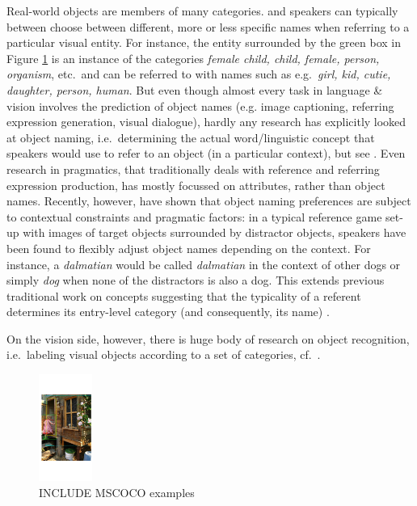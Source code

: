 \documentclass[runningheads]{llncs}
\begin{document}
Real-world objects are members of many categories. 
and speakers can typically between choose between different, more or less specific names when referring to a particular visual entity. 
For instance, the entity surrounded by the green box in Figure \ref{fig:example} is an instance of the categories \textit{female child, child, female, person, organism}, etc.\  and can be referred to with names such as e.g.\ \textit{girl, kid, cutie, daughter, person, human}.
But even though almost every task in language \& vision involves the prediction of object names (e.g. image captioning, referring expression generation, visual dialogue), hardly any research has explicitly looked at object naming, i.e.\ determining the actual word/linguistic concept that speakers would use to refer to an object (in a particular context), but see \cite{Ordonez:2016,zarriess-schlangen:2017}.
Even research in pragmatics, that traditionally deals with reference and referring expression production, has mostly focussed on attributes, rather than object names.
Recently, however, \cite{graf2016animal} have shown that object naming preferences are subject to contextual constraints and pragmatic factors: in a typical reference game set-up with images of target objects surrounded by distractor objects, speakers have been found to flexibly adjust object names depending on the context. For instance, a \textit{dalmatian} would be called \textit{dalmatian} in the context of other dogs or simply \textit{dog} when none of the distractors is also a dog.
This extends previous traditional work on concepts suggesting that the typicality of a referent determines its entry-level category (and consequently, its name) \cite{Rosch1978}.




On the vision side, however, there is huge body of research on object recognition, i.e.\ labeling visual objects according to a set of categories, cf.\ \cite{simonyan2014very,deng2014large,googlenet}.

\begin{figure}
\centering
\includegraphics[height=3.5cm]{fig/flickr_1000268201_boxes}
\caption{INCLUDE MSCOCO examples}
\label{fig:example}
\end{figure}
\end{document}
